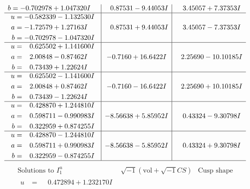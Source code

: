 \documentclass[1p]{elsarticle_modified}
\theoremstyle{definition}
\newcommand{\I}{\sqrt{-1}}
\begin{document}
$$\begin{array}{c|c|c}
\begin{aligned}
b &= -0.702978 + 1.047320 I\end{aligned}
 & \phantom{-}0.87531 - 9.44053 I & \phantom{-}3.45057 + 7.37353 I \\ \hline\begin{aligned}
u &= -0.582339 - 1.132530 I \\
a &= -1.72579 + 1.27163 I \\
b &= -0.702978 - 1.047320 I\end{aligned}
 & \phantom{-}0.87531 + 9.44053 I & \phantom{-}3.45057 - 7.37353 I \\ \hline\begin{aligned}
u &= \phantom{-}0.625502 + 1.141600 I \\
a &= \phantom{-}2.00848 - 0.87462 I \\
b &= \phantom{-}0.73439 + 1.22624 I\end{aligned}
 & -0.7160 + 16.6422 I & \phantom{-}2.25690 - 10.10185 I \\ \hline\begin{aligned}
u &= \phantom{-}0.625502 - 1.141600 I \\
a &= \phantom{-}2.00848 + 0.87462 I \\
b &= \phantom{-}0.73439 - 1.22624 I\end{aligned}
 & -0.7160 - 16.6422 I & \phantom{-}2.25690 + 10.10185 I \\ \hline\begin{aligned}
u &= \phantom{-}0.428870 + 1.244810 I \\
a &= \phantom{-}0.598711 - 0.990983 I \\
b &= \phantom{-}0.322959 + 0.874255 I\end{aligned}
 & -8.56638 + 5.85952 I & \phantom{-}0.43324 - 9.30798 I \\ \hline\begin{aligned}
u &= \phantom{-}0.428870 - 1.244810 I \\
a &= \phantom{-}0.598711 + 0.990983 I \\
b &= \phantom{-}0.322959 - 0.874255 I\end{aligned}
 & -8.56638 - 5.85952 I & \phantom{-}0.43324 + 9.30798 I\\
 \hline 
 \end{array}$$\newpage$$\begin{array}{c|c|c}  
\text{Solutions to }I^u_{1}& \I (\text{vol} + \sqrt{-1}CS) & \text{Cusp shape}\\
 \hline 
\begin{aligned}
u &= \phantom{-}0.472894 + 1.232170 I \\

\end{aligned}
\end{array}$$
\end{document}
